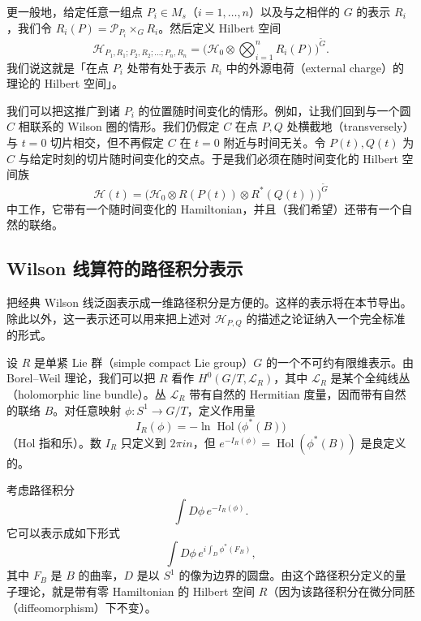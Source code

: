 更一般地，给定任意一组点 $P_i\in M_s$（$i=1,\dots,n$）以及与之相伴的 $G$ 的表示 $R_i$，我们令 $R_i(P)=\mathcal{P}_{P_i}\times_G R_i$。然后定义 Hilbert 空间
\[
\mathcal{H}_{P_1,R_1;P_2,R_2;\dots;P_n,R_n}=\bigl(\mathcal{H}_0\otimes\textstyle\bigotimes_{i=1}^{n}R_i(P)\bigr)^{\widetilde{G}} .
\]
我们说这就是「在点 $P_i$ 处带有处于表示 $R_i$ 中的外源电荷（external charge）的理论的 Hilbert 空间」。

我们可以把这推广到诸 $P_i$ 的位置随时间变化的情形。例如，让我们回到与一个圆 $C$ 相联系的 Wilson 圈的情形。我们仍假定 $C$ 在点 $P,Q$ 处横截地（transversely）与 $t=0$ 切片相交，但不再假定 $C$ 在 $t=0$ 附近与时间无关。令 $P(t),Q(t)$ 为 $C$ 与给定时刻的切片随时间变化的交点。于是我们必须在随时间变化的 Hilbert 空间族
\[
\mathcal{H}(t)=\bigl(\mathcal{H}_0\otimes R(P(t))\otimes R^*(Q(t))\bigr)^{\widetilde{G}}
\]
中工作，它带有一个随时间变化的 Hamiltonian，并且（我们希望）还带有一个自然的联络。


\subsection{Wilson 线算符的路径积分表示}

把经典 Wilson 线泛函表示成一维路径积分是方便的。这样的表示将在本节导出。除此以外，这一表示还可以用来把上述对 $\mathcal{H}_{P,Q}$ 的描述之论证纳入一个完全标准的形式。

设 $R$ 是单紧 Lie 群（simple compact Lie group）$G$ 的一个不可约有限维表示。由 Borel–Weil 理论，我们可以把 $R$ 看作 $H^0(G/T,\mathcal{L}_R)$，其中 $\mathcal{L}_R$ 是某个全纯线丛（holomorphic line bundle）。丛 $\mathcal{L}_R$ 带有自然的 Hermitian 度量，因而带有自然的联络 $B$。对任意映射 $\phi:S^1\to G/T$，定义作用量
\[
I_R(\phi)=-\ln\operatorname{Hol}\bigl(\phi^*(B)\bigr)
\]
（Hol 指和乐）。数 $I_R$ 只定义到 $2\pi i n$，但 $e^{-I_R(\phi)}=\operatorname{Hol}(\phi^*(B))$ 是良定义的。

考虑路径积分
\begin{equation}
  \tag{7.10}
  \label{eq:7-10}
  \int D\phi\,e^{-I_R(\phi)} .
\end{equation}
它可以表示成如下形式
\begin{equation}
  \tag{7.11}
  \label{eq:7-11}
  \int D\phi\,e^{i\int_D\phi^*(F_B)} ,
\end{equation}
其中 $F_B$ 是 $B$ 的曲率，$D$ 是以 $S^1$ 的像为边界的圆盘。由这个路径积分定义的量子理论，就是带有零 Hamiltonian 的 Hilbert 空间 $R$（因为该路径积分在微分同胚（diffeomorphism）下不变）。

